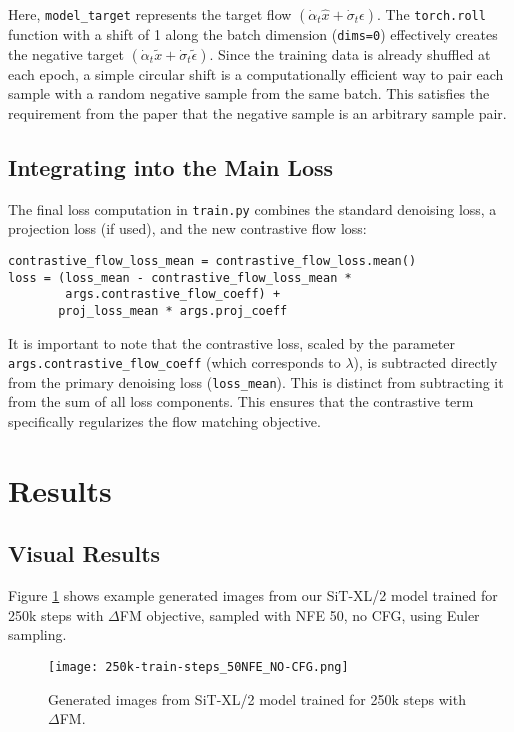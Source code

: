 \documentclass{article}
\begin{document}
Here, \texttt{model\_target} represents the target flow $(\dot{\alpha}_{t}\hat{x} + \dot{\sigma}_{t}\epsilon)$. The \texttt{torch.roll} function with a shift of 1 along the batch dimension (\texttt{dims=0}) effectively creates the negative target $(\dot{\alpha}_{t}\tilde{x} + \dot{\sigma}_{t}\tilde{\epsilon})$. Since the training data is already shuffled at each epoch, a simple circular shift is a computationally efficient way to pair each sample with a random negative sample from the same batch. This satisfies the requirement from the paper that the negative sample is an arbitrary sample pair.

\subsection{Integrating into the Main Loss}

The final loss computation in \texttt{train.py} combines the standard denoising loss, a projection loss (if used), and the new contrastive flow loss:

\begin{verbatim}
contrastive_flow_loss_mean = contrastive_flow_loss.mean()
loss = (loss_mean - contrastive_flow_loss_mean * 
        args.contrastive_flow_coeff) + 
       proj_loss_mean * args.proj_coeff
\end{verbatim}

It is important to note that the contrastive loss, scaled by the parameter \texttt{args.contrastive\_flow\_coeff} (which corresponds to $\lambda$), is subtracted directly from the primary denoising loss (\texttt{loss\_mean}). This is distinct from subtracting it from the sum of all loss components. This ensures that the contrastive term specifically regularizes the flow matching objective.

\section{Results}

\subsection{Visual Results}

Figure \ref{fig:generated_examples} shows example generated images from our SiT-XL/2 model trained for 250k steps with $\Delta$FM objective, sampled with NFE 50, no CFG, using Euler sampling.

\begin{figure}[h]
\centering
\texttt{[image: 250k-train-steps\_50NFE\_NO-CFG.png]}
\caption{Generated images from SiT-XL/2 model trained for 250k steps with $\Delta$FM.}
\label{fig:generated_examples}
\end{figure}
\end{document}
